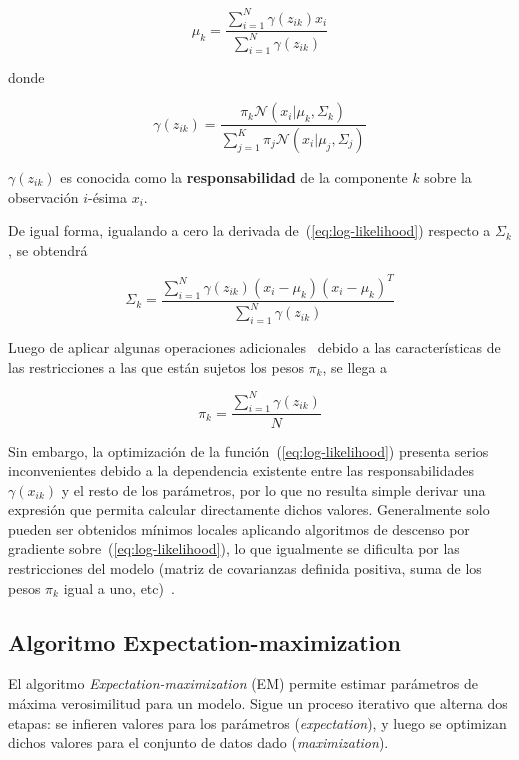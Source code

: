 \begin{equation}
    \label{eq:mu_k}
    \mu_k = \frac{\sum_{i=1}^{N}{\gamma(z_{ik})x_i}}{\sum_{i=1}^{N}{\gamma(z_{ik})}}
\end{equation}

\noindent
donde

\begin{equation}
    \label{eq:gamma}
    \gamma(z_{ik}) = \frac{\pi_k \mathcal{N}(x_i|\mu_k,\Sigma_k)}{\sum_{j=1}^{K}{\pi_j \mathcal{N}(x_i|\mu_j,\Sigma_j)}}
\end{equation}

$\gamma(z_{ik})$ es conocida como la \textbf{responsabilidad} de la componente $k$ sobre la observación $i$-ésima $x_i$.

De igual forma, igualando a cero la derivada de~(\ref{eq:log-likelihood}) respecto a $\Sigma_k$, se obtendrá

\begin{equation}
    \label{eq:Sigma_k}
    \Sigma_k = \frac{\sum_{i=1}^{N}{\gamma(z_{ik})(x_i-\mu_k)(x_i-\mu_k)^T}}{\sum_{i=1}^{N}{\gamma(z_{ik})}}
\end{equation}

Luego de aplicar algunas operaciones adicionales~\cite{Aggarawal13} debido a las características de las restricciones a las que están sujetos los pesos $\pi_k$, se llega a

\begin{equation}
    \label{eq:pi_k}
    \pi_k = \frac{\sum_{i=1}^{N}{\gamma(z_{ik})}}{N}
\end{equation}

Sin embargo, la optimización de la función~(\ref{eq:log-likelihood}) presenta serios inconvenientes debido a la dependencia existente entre las responsabilidades $\gamma(x_{ik})$ y el resto de los parámetros, por lo que no resulta simple derivar una expresión que permita calcular directamente dichos valores.
Generalmente solo pueden ser obtenidos mínimos locales aplicando algoritmos de descenso por gradiente sobre~(\ref{eq:log-likelihood}), lo que igualmente se dificulta por las restricciones del modelo (matriz de covarianzas definida positiva, suma de los pesos $\pi_k$ igual a uno, etc)~\cite{Aggarawal13,Murphy12}.

\subsection{Algoritmo Expectation-maximization}\label{subsec:EM}

El algoritmo \textit{Expectation-maximization} (EM) permite estimar parámetros de máxima verosimilitud para un modelo.
Sigue un proceso iterativo que alterna dos etapas: se infieren valores para los parámetros (\textit{expectation}), y luego se optimizan dichos valores para el conjunto de datos dado (\textit{maximization}).

